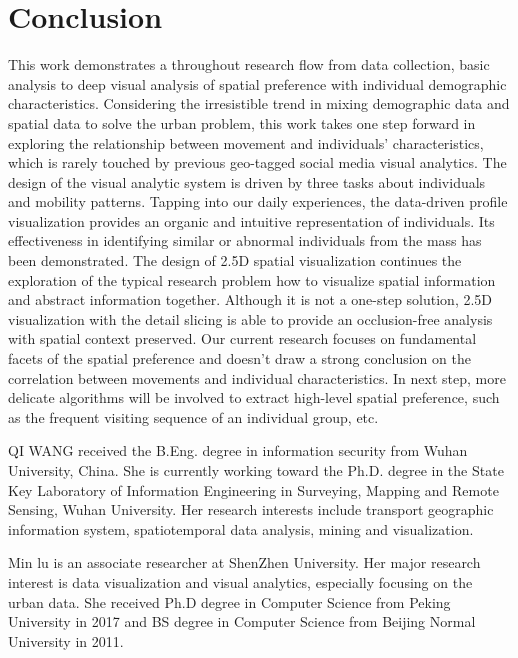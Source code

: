 \documentclass{ieeeaccess}
\begin{document}
\section{Conclusion}
\label{sec:conclusion}
This work demonstrates a throughout research flow from data collection, basic analysis to deep visual analysis of spatial preference with individual demographic characteristics. Considering the irresistible trend in mixing demographic data and spatial data to solve the urban problem, this work takes one step forward in exploring the relationship between movement and individuals’ characteristics, which is rarely touched by previous geo-tagged social media visual analytics. The design of the visual analytic system is driven by three tasks about individuals and mobility patterns. Tapping into our daily experiences, the data-driven profile visualization provides an organic and intuitive representation of individuals. Its effectiveness in identifying similar or abnormal individuals from the mass has been demonstrated. The design of 2.5D spatial visualization continues the exploration of the typical research problem how to visualize spatial information and abstract information together. Although it is not a one-step solution, 2.5D visualization with the detail slicing is able to provide an occlusion-free analysis with spatial context preserved.
Our current research focuses on fundamental facets of the spatial preference and doesn’t draw a strong conclusion on the correlation between movements and individual characteristics. In next step, more delicate algorithms will be involved to extract high-level spatial preference, such as the frequent visiting sequence of an individual group, etc.




\begin{IEEEbiography}{QI WANG} received the B.Eng. degree in information security from Wuhan University, China. She is currently working toward the Ph.D. degree in the State Key Laboratory of Information Engineering in Surveying, Mapping and Remote Sensing, Wuhan University. Her research interests include transport geographic information system, spatiotemporal data analysis, mining and visualization.
\end{IEEEbiography}

\begin{IEEEbiography}{Min lu} is an associate researcher at ShenZhen University. Her major research interest is data visualization and visual analytics, especially focusing on the urban data. She received Ph.D degree in Computer Science from Peking University in 2017 and BS degree in Computer Science from Beijing Normal University in 2011.
\end{IEEEbiography}
\end{document}
